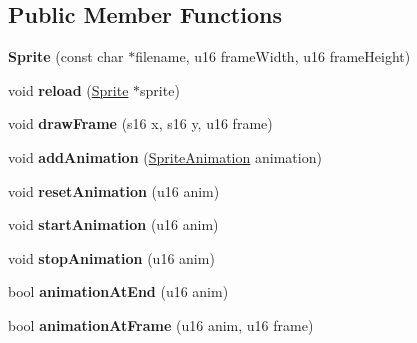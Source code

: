 \subsection*{Public Member Functions}
\begin{DoxyCompactItemize}
\item 
\hypertarget{classSprite_a647b6835ac09a05f4a70900209375b20}{{\bfseries Sprite} (const char $\ast$filename, u16 frame\-Width, u16 frame\-Height)}\label{classSprite_a647b6835ac09a05f4a70900209375b20}

\item 
\hypertarget{classSprite_a56c47941d57fc06ea741a89bca10724c}{void {\bfseries reload} (\hyperlink{classSprite}{Sprite} $\ast$sprite)}\label{classSprite_a56c47941d57fc06ea741a89bca10724c}

\item 
\hypertarget{classSprite_ad7562fbe17d1089e427a9068e651052d}{void {\bfseries draw\-Frame} (s16 x, s16 y, u16 frame)}\label{classSprite_ad7562fbe17d1089e427a9068e651052d}

\item 
\hypertarget{classSprite_ad1ed4ec3bf4cf4f53bbf3083a42669a8}{void {\bfseries add\-Animation} (\hyperlink{structSpriteAnimation}{Sprite\-Animation} animation)}\label{classSprite_ad1ed4ec3bf4cf4f53bbf3083a42669a8}

\item 
\hypertarget{classSprite_a096b71a7a19ee192d98184f5660d4aa0}{void {\bfseries reset\-Animation} (u16 anim)}\label{classSprite_a096b71a7a19ee192d98184f5660d4aa0}

\item 
\hypertarget{classSprite_a72dd3f871c8ac44b5460c27f19bda0ea}{void {\bfseries start\-Animation} (u16 anim)}\label{classSprite_a72dd3f871c8ac44b5460c27f19bda0ea}

\item 
\hypertarget{classSprite_a36b49e3976393236c429bdc3ff852fa5}{void {\bfseries stop\-Animation} (u16 anim)}\label{classSprite_a36b49e3976393236c429bdc3ff852fa5}

\item 
\hypertarget{classSprite_a9961ac23adcd7517dc0e385667183b66}{bool {\bfseries animation\-At\-End} (u16 anim)}\label{classSprite_a9961ac23adcd7517dc0e385667183b66}

\item 
\hypertarget{classSprite_af796c0565723dfd94bea0716999fbb83}{bool {\bfseries animation\-At\-Frame} (u16 anim, u16 frame)}\label{classSprite_af796c0565723dfd94bea0716999fbb83}


\end{DoxyCompactItemize}

